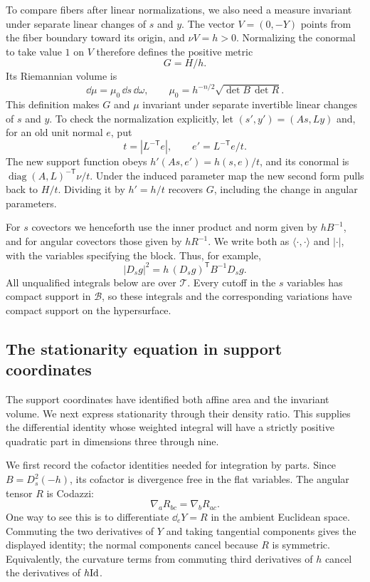 To compare fibers after linear normalizations, we also need a measure
invariant under separate linear changes of $s$ and $y$.
The vector $V=(0,-Y)$ points from the fiber boundary toward its origin,
and $\nu V=h>0$.  Normalizing the conormal to take value $1$ on $V$
therefore defines the positive metric
\[
 G=H/h.
\]
Its Riemannian volume is
\begin{equation}\label{eq:tube-volume}
 \dd\mu=\mu_0\,\dd s\,\dd\omega,
 \qquad
 \mu_0=h^{-n/2}\sqrt{\det B\,\det R}.
\end{equation}
This definition makes $G$ and $\mu$ invariant under separate invertible
linear changes of $s$ and $y$.  To check the normalization explicitly,
let $(s',y')=(As,Ly)$ and, for an old unit normal $e$, put
\[
 t=|L^{-\mathsf T}e|,
 \qquad e'=L^{-\mathsf T}e/t.
\]
The new support function obeys $h'(As,e')=h(s,e)/t$, and its conormal
is $\operatorname{diag}(A,L)^{-\mathsf T}\nu/t$.  Under the induced
parameter map the new second form pulls back to $H/t$.  Dividing it by
$h'=h/t$ recovers $G$, including the change in angular parameters.

For $s$ covectors we henceforth use the inner product and norm given by
$hB^{-1}$, and for angular covectors those given by $hR^{-1}$.  We write
both as $\langle\cdot,\cdot\rangle$ and $|\cdot|$, with the variables
specifying the block.  Thus, for example,
\[
 |D_sg|^2=h\,(D_sg)^{\mathsf T}B^{-1}D_sg.
\]
All unqualified integrals below are over $\mathcal T$.  Every cutoff in
the $s$ variables has compact support in $\mathcal B$, so these
integrals and the corresponding variations have compact support on
the hypersurface.

\subsection{The stationarity equation in support coordinates}

The support coordinates have identified both affine area and the
invariant volume. We next express stationarity through their density
ratio. This supplies the differential identity whose weighted integral
will have a strictly positive quadratic part in dimensions three
through nine.

We first record the cofactor identities needed for integration by
parts.  Since $B=D_s^2(-h)$, its cofactor is divergence free in the
flat variables.  The angular tensor $R$ is Codazzi:
\[
 \nabla_aR_{bc}=\nabla_bR_{ac}.
\]
One way to see this is to differentiate $\dd_eY=R$ in the ambient
Euclidean space.  Commuting the two derivatives of $Y$ and taking
tangential components gives the displayed identity; the normal
components cancel because $R$ is symmetric.  Equivalently, the
curvature terms from commuting third derivatives of $h$ cancel the
derivatives of $h\mathrm{Id}$.

